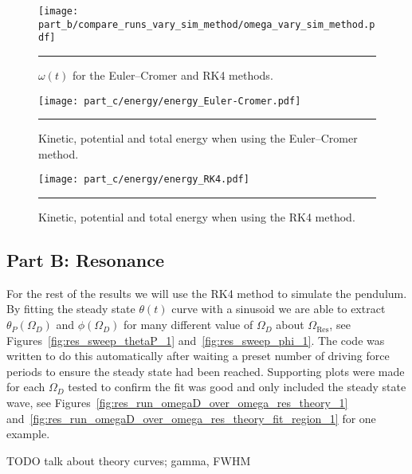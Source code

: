 \documentclass[notitlepage,aps,prd,nofootinbib]{revtex4-1}
\begin{document}
\begin{figure}[!htbc]
  \centering
  \texttt{[image: part\_b/compare\_runs\_vary\_sim\_method/omega\_vary\_sim\_method.pdf]}
	{\par\nobreak\rule[9pt]{35em}{0.5pt}\vspace{-5mm}}
	\caption{$\omega\left(t\right)$ for the Euler--Cromer and RK4 methods.}
	\label{fig:omega_vary_sim_method}
\end{figure}

\begin{figure}[!htbc]
  \centering
  \texttt{[image: part\_c/energy/energy\_Euler-Cromer.pdf]}
	{\par\nobreak\rule[9pt]{35em}{0.5pt}\vspace{-5mm}}
	\caption{Kinetic, potential and total energy when using the Euler--Cromer method.}
	\label{fig:energy_Euler-Cromer}
\end{figure}

\begin{figure}[!htbc]
  \centering
  \texttt{[image: part\_c/energy/energy\_RK4.pdf]}
	{\par\nobreak\rule[9pt]{35em}{0.5pt}\vspace{-5mm}}
	\caption{Kinetic, potential and total energy when using the RK4 method.}
	\label{fig:energy_RK4}
\end{figure}

\clearpage
\subsection{Part B: Resonance}
\label{subsec:resonance_results}
For the rest of the results we will use the RK4 method to simulate the pendulum. By fitting the steady state $\theta\left(t\right)$ curve with a sinusoid we are able to extract $\theta_{P}\left(\Omega_{D}\right)$ and $\phi\left(\Omega_{D}\right)$ for many different value of $\Omega_{D}$ about $\Omega_{\text{Res}}$, see Figures~\ref{fig:res_sweep_thetaP_1} and~\ref{fig:res_sweep_phi_1}. The code was written to do this automatically after waiting a preset number of driving force periods to ensure the steady state had been reached. Supporting plots were made for each $\Omega_{D}$ tested to confirm the fit was good and only included the steady state wave, see Figures~\ref{fig:res_run_omegaD_over_omega_res_theory_1} and~\ref{fig:res_run_omegaD_over_omega_res_theory_fit_region_1} for one example.

TODO talk about theory curves; gamma, FWHM
\end{document}
